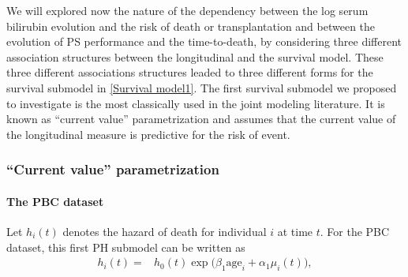 \documentclass[12pt]{article}
\begin{document}
We will explored now the nature of the dependency between the log serum bilirubin evolution and the risk of death or transplantation and between the evolution of PS performance and the time-to-death, by considering three different association structures between the longitudinal and the survival model. These three different associations structures leaded to three different forms for the survival submodel in \eqref{Survival model1}.
The first survival submodel we proposed to investigate is the most classically used in the joint modeling literature. It is known as ``current value'' parametrization and assumes that the current value of the longitudinal measure is predictive for the risk of event.

\subsubsection{``Current value'' parametrization}
\label{CV}

\paragraph{The PBC dataset}

Let $h_i(t)$ denotes the hazard of death for individual $i$ at time $t$. For the PBC dataset, this first PH submodel can be written as
\begin{equation}
\begin{split}
h_i(t) = &h_0 (t) \exp \big(\beta_1 \text{age}_i+ \alpha_1 \mu_i(t)\big),
\end{split}
\label{Survival model_p1}
\end{equation}
\end{document}
